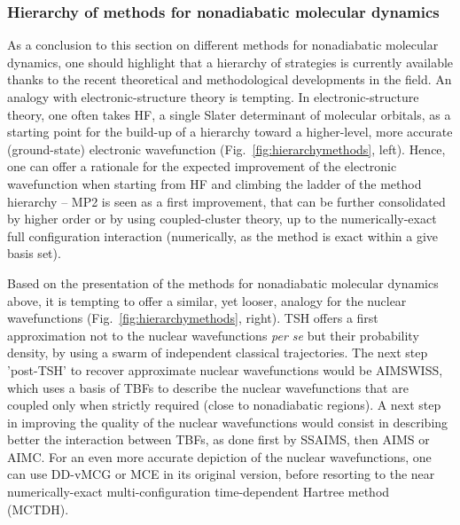 \documentclass[9pt,bestpractices]{livecoms}
\begin{document}
\subsubsection{Hierarchy of methods for nonadiabatic molecular dynamics}

As a conclusion to this section on different methods for nonadiabatic molecular dynamics, one should highlight that a hierarchy of strategies is currently available thanks to the recent theoretical and methodological developments in the field. An analogy with electronic-structure theory is tempting. In electronic-structure theory, one often takes HF, a single Slater determinant of molecular orbitals, as a starting point for the build-up of a hierarchy toward a higher-level, more accurate (ground-state) electronic wavefunction (Fig.~\ref{fig:hierarchymethods}, left). Hence, one can offer a rationale for the expected improvement of the electronic wavefunction when starting from HF and climbing the ladder of the method hierarchy -- MP2 is seen as a first improvement, that can be further consolidated by higher order or by using coupled-cluster theory, up to the numerically-exact full configuration interaction (numerically, as the method is exact within a give basis set).  

Based on the presentation of the methods for nonadiabatic molecular dynamics above, it is tempting to offer a similar, yet looser, analogy for the nuclear wavefunctions (Fig.~\ref{fig:hierarchymethods}, right).\cite{lassmann2025thesis} TSH offers a first approximation not to the nuclear wavefunctions \textit{per se} but their probability density, by using a swarm of independent classical trajectories. The next step 'post-TSH' to recover approximate nuclear wavefunctions would be AIMSWISS, which uses a basis of TBFs to describe the nuclear wavefunctions that are coupled only when strictly required (close to nonadiabatic regions). A next step in improving the quality of the nuclear wavefunctions would consist in describing better the interaction between TBFs, as done first by SSAIMS, then AIMS or AIMC. For an even more accurate depiction of the nuclear wavefunctions, one can use DD-vMCG or MCE in its original version, before resorting to the near numerically-exact multi-configuration time-dependent Hartree method (MCTDH).\cite{Beck2000,mctdhnonad,gatti2014molecular}
\end{document}
